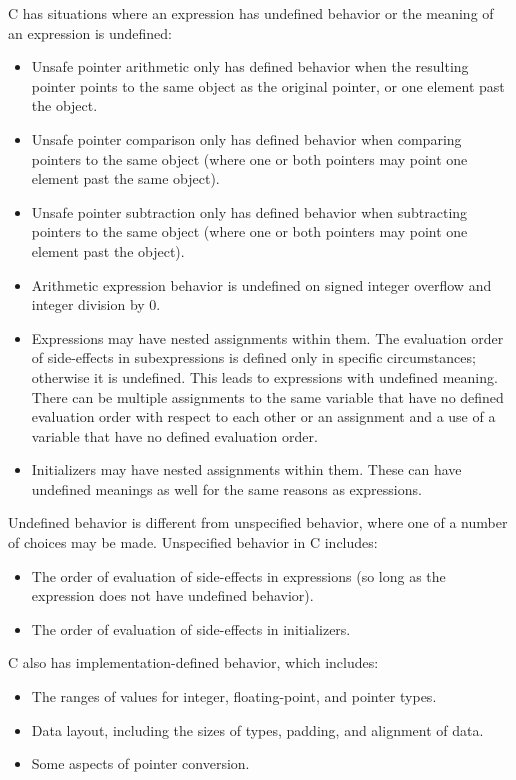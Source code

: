 C has situations where an expression has undefined behavior or the
meaning of an expression is undefined:

\begin{itemize}
\item
  Unsafe pointer arithmetic only has defined behavior when the resulting
  pointer points to the same object as the original pointer, or one
  element past the object.
\item
  Unsafe pointer comparison only has defined behavior when comparing
  pointers to the same object (where one or both pointers may point one
  element past the same object).
\item
  Unsafe pointer subtraction only has defined behavior when subtracting
  pointers to the same object (where one or both pointers may point one
  element past the object).
\item
  Arithmetic expression behavior is undefined on signed integer overflow
  and integer division by 0.
\item
  Expressions may have nested assignments within them. The evaluation
  order of side-effects in subexpressions is defined only in specific
  circumstances; otherwise it is undefined. This leads to expressions
  with undefined meaning. There can be multiple assignments to the same
  variable that have no defined evaluation order with respect to each
  other or an assignment and a use of a variable that have no defined
  evaluation order.
\item
  Initializers may have nested assignments within them. These can have
  undefined meanings as well for the same reasons as expressions.
\end{itemize}

Undefined behavior is different from unspecified behavior, where one of
a number of choices may be made. Unspecified behavior in C includes:

\begin{itemize}
\item
  The order of evaluation of side-effects in expressions (so long as the
  expression does not have undefined behavior).
\item
  The order of evaluation of side-effects in initializers.
\end{itemize}

C also has implementation-defined behavior, which includes:

\begin{itemize}
\item
  The ranges of values for integer, floating-point, and pointer types.
\item
  Data layout, including the sizes of types, padding, and alignment of
  data.
\item
  Some aspects of pointer conversion.
\end{itemize}

